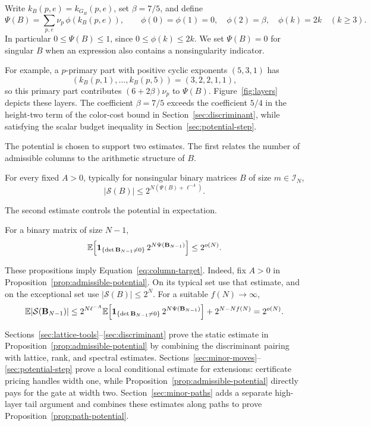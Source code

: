 Write \(k_B(p,e)=k_{G_B}(p,e)\), set \(\beta=7/5\), and define
\begin{equation}\label{eq:potential}
 \Psi(B)=\sum_{p,e}\nu_p\,\phi(k_B(p,e)),\qquad
 \phi(0)=\phi(1)=0,\quad
 \phi(2)=\beta,\quad
 \phi(k)=2k\quad(k\ge3).
\end{equation}
In particular \(0\le\Psi(B)\le1\), since \(0\le\phi(k)\le2k\).
We set \(\Psi(B)=0\) for singular \(B\) when an expression also
contains a nonsingularity indicator.

For example, a \(p\)-primary part with positive cyclic exponents
\((5,3,1)\) has
\[
 (k_B(p,1),\ldots,k_B(p,5))=(3,2,2,1,1),
\]
so this primary part contributes \((6+2\beta)\nu_p\) to \(\Psi(B)\).
Figure~\ref{fig:layers} depicts these layers. The coefficient
\(\beta=7/5\) exceeds the coefficient \(5/4\) in the height-two term of
the color-cost bound in Section~\ref{sec:discriminant}, while satisfying
the scalar budget inequality in Section~\ref{sec:potential-step}.

The potential is chosen to support two estimates. The first relates
the number of admissible columns to the arithmetic structure of \(B\).

\begin{proposition}\label{prop:admissible-potential}
For every fixed \(A>0\), typically for nonsingular binary matrices
\(B\) of size \(m\in\mathcal I_N\),
\[
 |\mathcal S(B)|\le 2^{N(\Psi(B)+\ell^{-A})}.
\]
\end{proposition}

The second estimate controls the potential in expectation.

\begin{proposition}\label{prop:path-potential}
For a binary matrix of size \(N-1\),
\[
 \mathbb E\!\left[\mathbf 1_{\{\det\mathbf B_{N-1}\ne0\}}\,
            2^{N\Psi(\mathbf B_{N-1})}\right]\le 2^{o(N)}.
\]
\end{proposition}

These propositions imply Equation~\eqref{eq:column-target}. Indeed,
fix \(A>0\) in Proposition~\ref{prop:admissible-potential}. On its
typical set use that estimate, and on the exceptional set use
\(|\mathcal S(B)|\le2^N\). For a suitable \(f(N)\to\infty\),
\[
 \mathbb E|\mathcal S(\mathbf B_{N-1})|
 \le 2^{N\ell^{-A}}
     \mathbb E\!\left[\mathbf 1_{\{\det\mathbf B_{N-1}\ne0\}}\,
                2^{N\Psi(\mathbf B_{N-1})}\right]
       +2^{N-Nf(N)}
 =2^{o(N)}.
\]

Sections~\ref{sec:lattice-tools}--\ref{sec:discriminant} prove the static
estimate in Proposition~\ref{prop:admissible-potential} by combining the
discriminant pairing with lattice, rank, and spectral estimates.
Sections~\ref{sec:minor-moves}--\ref{sec:potential-step} prove a local
conditional estimate for extensions: certificate pricing handles width
one, while Proposition~\ref{prop:admissible-potential} directly pays for
the gate at width two. Section~\ref{sec:minor-paths} adds a separate
high-layer tail argument and combines these estimates along paths to
prove Proposition~\ref{prop:path-potential}.
